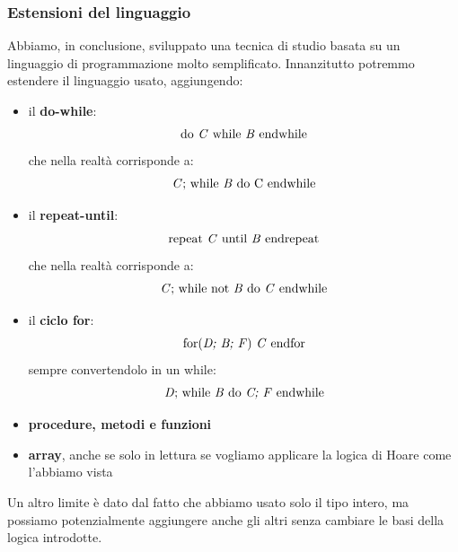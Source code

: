 				      				\subsubsection{Estensioni del linguaggio}
				      				Abbiamo, in conclusione, sviluppato una tecnica di studio basata su un
				      				linguaggio di programmazione molto semplificato. Innanzitutto potremmo estendere
				      				il linguaggio usato, aggiungendo:
				      				\begin{itemize}
				      					\item il \textbf{do-while}:
				      					      \[\mbox{do \textit{C} while \textit{B} endwhile}\]
				      					      che nella realtà corrisponde a:
				      					      \[\mbox{\textit{C}; while \textit{B} do
				      					      		\textnormal{C} endwhile}\]
				      					      	\item il \textbf{repeat-until}:
				      					      	\[\mbox{repeat \textit{C} until \textit{B} endrepeat}\]
				      					      	che nella realtà corrisponde a:
				      					      	\[\mbox{\textit{C}; while not \textit{B} do
				      					      			\textit{C} endwhile}\]
				      					      		\item il \textbf{ciclo for}:
				      					      		\[\mbox{for(\textit{D; B; F}) \textit{C} endfor} \]
				      					      		sempre convertendolo in un while:
				      					      		\[\mbox{\textit{D}; while \textit{B} do
				      					      				\textit{C; F}  endwhile}\]
				      					      			\item \textbf{procedure, metodi e funzioni}
				      					      			\item \textbf{array}, anche se solo in lettura se vogliamo applicare la logica
				      					      			di Hoare come l'abbiamo vista
				      					      			\end{itemize}
				      					      			Un altro limite è dato dal fatto che abbiamo usato solo il tipo intero, ma
				      					      			possiamo potenzialmente aggiungere anche gli altri senza cambiare le basi della
				      					      			logica introdotte.
